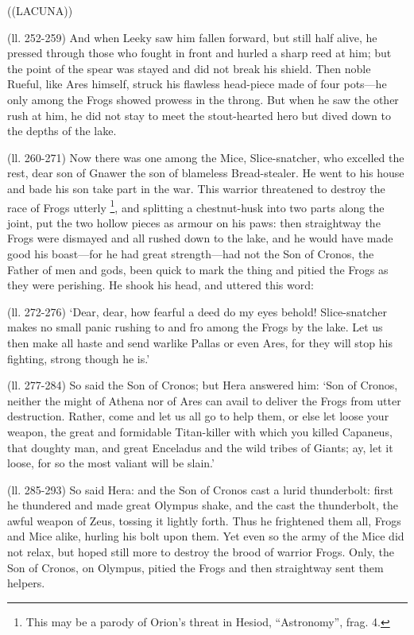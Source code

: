 ((LACUNA))

(ll. 252-259) And when Leeky saw him fallen forward, but still half alive, he
pressed through those who fought in front and hurled a sharp reed at him; but
the point of the spear was stayed and did not break his shield. Then noble
Rueful, like Ares himself, struck his flawless head-piece made of four
pots—he only among the Frogs showed prowess in the throng. But when he
saw the other rush at him, he did not stay to meet the stout-hearted hero but
dived down to the depths of the lake.

(ll. 260-271) Now there was one among the Mice, Slice-snatcher, who excelled
the rest, dear son of Gnawer the son of blameless Bread-stealer. He went to his
house and bade his son take part in the war. This warrior threatened to destroy
the race of Frogs utterly \footnote{This may be a parody of
Orion’s threat in Hesiod, “Astronomy”, frag. 4.}, and splitting a chestnut-husk
into two parts along the joint, put the two hollow pieces as armour on his
paws: then straightway the Frogs were dismayed and all rushed down to the lake,
and he would have made good his boast—for he had great strength—had
not the Son of Cronos, the Father of men and gods, been quick to mark the thing
and pitied the Frogs as they were perishing. He shook his head, and uttered
this word:

(ll. 272-276) ‘Dear, dear, how fearful a deed do my eyes behold!
Slice-snatcher makes no small panic rushing to and fro among the Frogs by the
lake. Let us then make all haste and send warlike Pallas or even Ares, for they
will stop his fighting, strong though he is.’

(ll. 277-284) So said the Son of Cronos; but Hera answered him: ‘Son of
Cronos, neither the might of Athena nor of Ares can avail to deliver the Frogs
from utter destruction. Rather, come and let us all go to help them, or else
let loose your weapon, the great and formidable Titan-killer with which you
killed Capaneus, that doughty man, and great Enceladus and the wild tribes of
Giants; ay, let it loose, for so the most valiant will be slain.’

(ll. 285-293) So said Hera: and the Son of Cronos cast a lurid thunderbolt:
first he thundered and made great Olympus shake, and the cast the thunderbolt,
the awful weapon of Zeus, tossing it lightly forth. Thus he frightened them
all, Frogs and Mice alike, hurling his bolt upon them. Yet even so the army of
the Mice did not relax, but hoped still more to destroy the brood of warrior
Frogs. Only, the Son of Cronos, on Olympus, pitied the Frogs and then
straightway sent them helpers.

